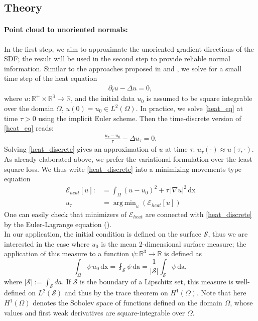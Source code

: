 \documentclass[draft,12pt,openany]{book}
\newcommand{\R}{\mathbb{R}}
\def\S{\mathcal{S}}
\theoremstyle{plainnormal}
\theoremstyle{remark}
\DeclareMathOperator*{\argmin}{arg\,min}
\begin{document}
\subsection{Theory}
\paragraph{Point cloud to unoriented normals:}
In the first step, we aim to approximate the unoriented gradient directions of the SDF; the result will be used in the second step to provide reliable normal information. Similar to the approaches proposed in \cite{Crane_2013} and \cite{FengCrane}, we solve for a small time step of the heat equation 
\begin{align}
\partial_t u - \Delta u = 0 \label{heat_eq},
\end{align} where $u: \R^+ \times \R^3 \rightarrow \R$, and the initial data $u_0$ is assumed to be square integrable over the domain $\Omega$, $u(0) = u_0 \in L^2(\Omega)$. In practice, we solve \cref{heat_eq} at time $\tau > 0$ using the implicit Euler scheme. Then the time-discrete version of \cref{heat_eq} reads: 
\begin{align}\label{heat_discrete}
    \frac{u_\tau - u_0}{\tau} - \Delta u_\tau = 0.
\end{align}
Solving \cref{heat_discrete} gives an approximation of $u$ at time $\tau$: $u_\tau(\cdot) \approx u(\tau,\cdot)$.\\
As already elaborated above, we prefer the variational formulation over the least square loss. We thus write \cref{heat_discrete} into a minimizing movements type equation
\begin{align}\label{loss_heat}
    \mathcal{E}_{heat}[u] :&= \int_\Omega (u - u_0)^2 + \tau\, |\nabla u|^2 \,\mathrm{dx} \\
    u_\tau &= \argmin_u (\mathcal{E}_{heat}[u])
\end{align}
One can easily check that minimizers of $\mathcal{E}_{heat}$ are connected with \cref{heat_discrete} by the Euler-Lagrange equation (). \\
In our application, the initial condition is defined on the surface $\S$, thus we are interested in the case where $u_0$ is the mean 2-dimensional surface measure; the application of this measure to a function $\psi: \R^3 \rightarrow\R$ is defined as$$\int_\Omega \psi \,u_0 \,\mathrm{dx} =\fint_\S \psi\,\mathrm{da} = \frac{1}{|\mathcal{S}|} \int_\mathcal{S} \psi \,\mathrm{da},$$
where $|\mathcal{S}| := \int_\S da$.
If $\S$ is the boundary of a Lipschitz set, this measure is well-defined on $L^2(\S)$ and thus by the trace theorem on $H^1(\Omega)$. Note that here $H^1(\Omega)$ denotes the Sobolev space of functions defined on the domain $\Omega$, whose values and first weak derivatives are square-integrable over $\Omega$.
\end{document}
